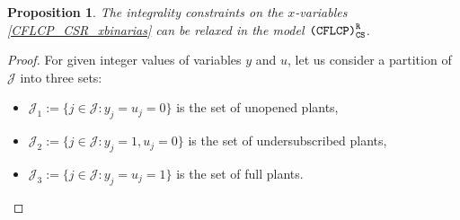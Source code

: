 \documentclass[preprint,11pt,authoryear]{elsarticle}
\def\J{\mathcal{J}}
\newtheorem{prop}[theorem]{Proposition}
\begin{document}
\begin{prop} \label{pro: 3}
    The integrality constraints on the $x$-variables \eqref{CFLCP_CSR_xbinarias} can be relaxed in the model ${\normalfont\texttt{(CFLCP)}_{\texttt{CS}}^\texttt{R}}$.  
\end{prop}
\begin{proof}
    For given integer values of variables $y$ and $u$, let us consider a partition of $\J$ into three sets:
    \begin{itemize}
        \item $\J_1 := \{j\in \J: y_j=u_j=0 \}$ is the set of unopened plants,
        \item $\J_2 := \{j\in \J: y_j=1, u_j=0 \}$ is the set of undersubscribed plants,
        \item $\J_3 := \{j\in \J: y_j=u_j=1 \}$ is the set of full plants.
    \end{itemize}


\end{proof}
\end{document}
